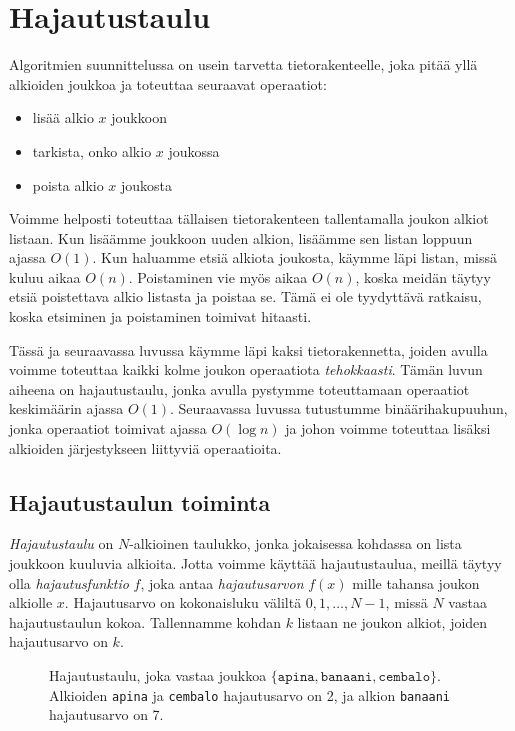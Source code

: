 \chapter{Hajautustaulu}

Algoritmien suunnittelussa on usein tarvetta
tietorakenteelle, joka pitää yllä alkioiden joukkoa
ja toteuttaa seuraavat operaatiot:

\begin{itemize}
\item lisää alkio $x$ joukkoon
\item tarkista, onko alkio $x$ joukossa
\item poista alkio $x$ joukosta
\end{itemize}

Voimme helposti toteuttaa tällaisen tietorakenteen
tallentamalla joukon alkiot listaan.
Kun lisäämme joukkoon uuden alkion,
lisäämme sen listan loppuun ajassa $O(1)$.
Kun haluamme etsiä alkiota joukosta,
käymme läpi listan, missä kuluu aikaa $O(n)$.
Poistaminen vie myös aikaa $O(n)$, koska meidän täytyy
etsiä poistettava alkio listasta ja poistaa se.
Tämä ei ole tyydyttävä ratkaisu,
koska etsiminen ja poistaminen toimivat hitaasti.

Tässä ja seuraavassa luvussa käymme läpi kaksi
tietorakennetta, joiden avulla voimme toteuttaa kaikki
kolme joukon operaatiota \emph{tehokkaasti}.
Tämän luvun aiheena on hajautustaulu,
jonka avulla pystymme toteuttamaan operaatiot
keskimäärin ajassa $O(1)$.
Seuraavassa luvussa tutustumme binäärihaku\-puuhun,
jonka operaatiot toimivat ajassa $O(\log n)$
ja johon voimme toteuttaa lisäksi alkioiden järjestykseen
liittyviä operaatioita.

\section{Hajautustaulun toiminta}

\emph{Hajautustaulu} on $N$-alkioinen taulukko,
jonka jokaisessa kohdassa on lista joukkoon kuuluvia alkioita.
Jotta voimme käyttää hajautustaulua,
meillä täytyy olla \emph{hajautusfunktio} $f$,
joka antaa \emph{hajautusarvon}
$f(x)$ mille tahansa joukon alkiolle $x$.
Hajautusarvo on kokonaisluku väliltä
$0,1,\dots,N-1$, missä $N$ vastaa hajautustaulun kokoa.
Tallennamme kohdan $k$ listaan ne joukon alkiot,
joiden hajautusarvo on $k$.

\begin{figure}
\caption{Hajautustaulu, joka vastaa joukkoa $\{\texttt{apina},\texttt{banaani},\texttt{cembalo}\}$.
Alkioiden \texttt{apina} ja \texttt{cembalo} hajautusarvo on 2,
ja alkion \texttt{banaani} hajautusarvo on 7.}
\label{fig:hajtau}
\end{figure}

